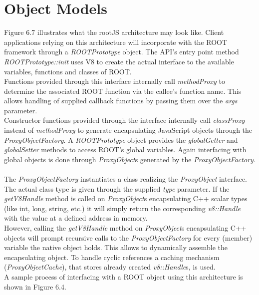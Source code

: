 \section{Object Models}
Figure 6.7 illustrates what the rootJS architecture may look like.
Client applications relying on this architecture will incorporate with the ROOT framework through a \textit{ROOTPrototype} object.
The API's entry point method \textit{ROOTPrototype::init} uses V8 to create the actual interface to the available variables, functions and classes of ROOT.\\
Functions provided through this interface internally call \textit{methodProxy} to determine the associated ROOT function via the callee's function name. This allows handling of supplied callback functions by passing them over the \textit{args} parameter.\\
Constructor functions provided through the interface internally call \textit{classProxy} instead of \textit{methodProxy} to generate encapsulating JavaScript objects through the \textit{ProxyObjectFactory}.
A \textit{ROOTPrototype} object provides the \textit{globalGetter} and \textit{globalSetter} methods to access ROOT's global variables. Again interfacing with global objects is done through \textit{ProxyObject}s generated by the \textit{ProxyObjectFactory}.
\\ \\
The \textit{ProxyObjectFactory} instantiates a class realizing the \textit{ProxyObject} interface. The actual class type is given through the supplied \textit{type} parameter.
If the \textit{getV8Handle} method is called on \textit{ProxyObject}s encapsulating C++ scalar types (like int, long, string, etc.) it will simply return the corresponding \textit{v8::Handle} with the value at a defined address in memory.\\
However, calling the \textit{getV8Handle} method on \textit{ProxyObject}s encapsulating C++ objects will prompt recursive calls to the \textit{ProxyObjectFactory} for every (member) variable the native object holds. This allows to dynamically assemble the encapsulating object.
To handle cyclic references a caching mechanism (\textit{ProxyObjectCache}), that stores already created \textit{v8::Handle}s, is used.\\
A sample process of interfacing with a ROOT object using this architecture is shown in Figure 6.4.

